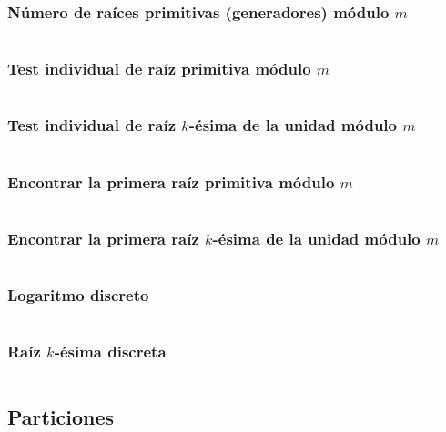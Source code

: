 \documentclass[11pt]{article}
\begin{document}
			\subsubsection{Número de raíces primitivas (generadores) módulo $m$}
			\inputminted[tabsize=2,breaklines,firstline=319,lastline=325,fontsize=\small]{c++}{numberTheory.cpp}
			
			\subsubsection{Test individual de raíz primitiva módulo $m$}
			\inputminted[tabsize=2,breaklines,firstline=327,lastline=337,fontsize=\small]{c++}{numberTheory.cpp}
			
			\subsubsection{Test individual de raíz $k$-ésima de la unidad módulo $m$}
			\inputminted[tabsize=2,breaklines,firstline=339,lastline=348,fontsize=\small]{c++}{numberTheory.cpp}
			
			\subsubsection{Encontrar la primera raíz primitiva módulo $m$}
			\inputminted[tabsize=2,breaklines,firstline=350,lastline=367,fontsize=\small]{c++}{numberTheory.cpp}
			
			\subsubsection{Encontrar la primera raíz $k$-ésima de la unidad módulo $m$}
			\inputminted[tabsize=2,breaklines,firstline=369,lastline=385,fontsize=\small]{c++}{numberTheory.cpp}
			
			\subsubsection{Logaritmo discreto}
			\inputminted[tabsize=2,breaklines,firstline=387,lastline=410,fontsize=\small]{c++}{numberTheory.cpp}
			
			\subsubsection{Raíz $k$-ésima discreta}
			\inputminted[tabsize=2,breaklines,firstline=412,lastline=429,fontsize=\small]{c++}{numberTheory.cpp}
			
		\subsection{Particiones}
\end{document}
